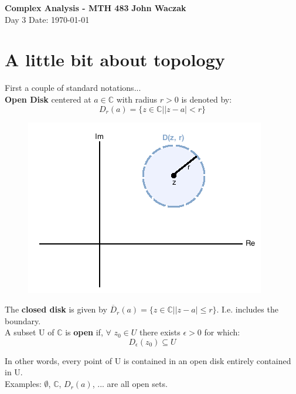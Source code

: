 \documentclass[a4paper, 11pt]{article}
\begin{document}
\noindent
\large\textbf{Complex Analysis - MTH 483} \hfill \textbf{John Waczak} \\
\normalsize Day 3 \hfill  Date: \today \\

\section*{A little bit about topology}
First a couple of standard notations... \\

\textbf{Open Disk} centered at $a\in\mathbb{C}$ with radius $r>0$ is denoted by:
	\begin{equation}
		D_r(a) = \{z\in\mathbb{C}| |z-a|<r\}
	\end{equation}
	\begin{figure}[!hbt]
		\centering
		\includegraphics[scale=0.75]{disk}
	\end{figure}

The \textbf{closed disk} is given by $\overline{D}_r(a) = \{z\in\mathbb{C}| |z-a|\leq r\}$. I.e. includes the boundary. \\

A subset U of $\mathbb{C}$ is \textbf{open} if, $\forall$ $z_0 \in U$ there exists $\epsilon > 0$ for which:
	\begin{equation*}
		D_\epsilon(z_0) \subseteq U
	\end{equation*}

In other words, every point of U is contained in an open disk entirely contained in U. \\

Examples: $\emptyset$, $\mathbb{C}$, $D_r(a)$, ... are all open sets. \\
\end{document}
